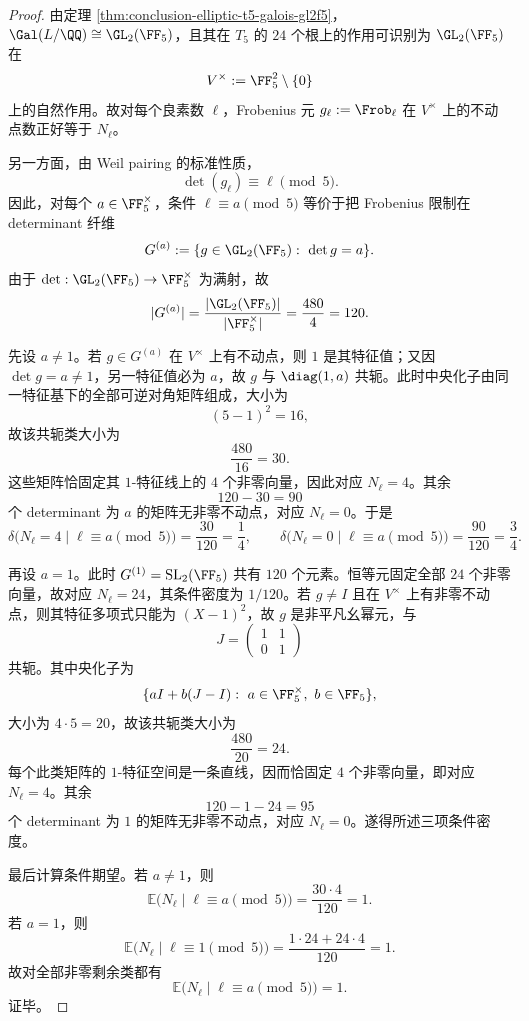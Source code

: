 \begin{proof}
由定理 \ref{thm:conclusion-elliptic-t5-galois-gl2f5}，\(\Gal(L/\QQ)\cong \GL_2(\FF_5)\)，且其在 \(T_5\) 的 \(24\) 个根上的作用可识别为 \(\GL_2(\FF_5)\) 在
\[
V^\times:=\FF_5^2\setminus\{0\}
\]
上的自然作用。故对每个良素数 \(\ell\)，Frobenius 元 \(g_\ell:=\Frob_\ell\) 在 \(V^\times\) 上的不动点数正好等于 \(N_\ell\)。

另一方面，由 Weil pairing 的标准性质，
\[
\det(g_\ell)\equiv \ell \pmod 5.
\]
因此，对每个 \(a\in\FF_5^\times\)，条件 \(\ell\equiv a\pmod 5\) 等价于把 Frobenius 限制在 determinant 纤维
\[
G^{(a)}:=\{g\in \GL_2(\FF_5):\ \det g=a\}.
\]
由于 \(\det:\GL_2(\FF_5)\to \FF_5^\times\) 为满射，故
\[
|G^{(a)}|=\frac{|\GL_2(\FF_5)|}{|\FF_5^\times|}=\frac{480}{4}=120.
\]

先设 \(a\neq 1\)。若 \(g\in G^{(a)}\) 在 \(V^\times\) 上有不动点，则 \(1\) 是其特征值；又因 \(\det g=a\neq 1\)，另一特征值必为 \(a\)，故 \(g\) 与 \(\diag(1,a)\) 共轭。此时中央化子由同一特征基下的全部可逆对角矩阵组成，大小为
\[
(5-1)^2=16,
\]
故该共轭类大小为
\[
\frac{480}{16}=30.
\]
这些矩阵恰固定其 \(1\)-特征线上的 \(4\) 个非零向量，因此对应 \(N_\ell=4\)。其余
\[
120-30=90
\]
个 determinant 为 \(a\) 的矩阵无非零不动点，对应 \(N_\ell=0\)。于是
\[
\delta\!\bigl(N_\ell=4\mid \ell\equiv a\!\!\!\!\pmod 5\bigr)=\frac{30}{120}=\frac14,
\qquad
\delta\!\bigl(N_\ell=0\mid \ell\equiv a\!\!\!\!\pmod 5\bigr)=\frac{90}{120}=\frac34.
\]

再设 \(a=1\)。此时 \(G^{(1)}=\mathrm{SL}_2(\FF_5)\) 共有 \(120\) 个元素。恒等元固定全部 \(24\) 个非零向量，故对应 \(N_\ell=24\)，其条件密度为 \(1/120\)。若 \(g\neq I\) 且在 \(V^\times\) 上有非零不动点，则其特征多项式只能为 \((X-1)^2\)，故 \(g\) 是非平凡幺幂元，与
\[
J=\begin{pmatrix}1&1\\0&1\end{pmatrix}
\]
共轭。其中央化子为
\[
\{aI+b(J-I):\ a\in \FF_5^\times,\ b\in \FF_5\},
\]
大小为 \(4\cdot 5=20\)，故该共轭类大小为
\[
\frac{480}{20}=24.
\]
每个此类矩阵的 \(1\)-特征空间是一条直线，因而恰固定 \(4\) 个非零向量，即对应 \(N_\ell=4\)。其余
\[
120-1-24=95
\]
个 determinant 为 \(1\) 的矩阵无非零不动点，对应 \(N_\ell=0\)。遂得所述三项条件密度。

最后计算条件期望。若 \(a\neq 1\)，则
\[
\mathbb E\!\bigl(N_\ell\mid \ell\equiv a\!\!\!\!\pmod 5\bigr)
=
\frac{30\cdot 4}{120}
=
1.
\]
若 \(a=1\)，则
\[
\mathbb E\!\bigl(N_\ell\mid \ell\equiv 1\!\!\!\!\pmod 5\bigr)
=
\frac{1\cdot 24+24\cdot 4}{120}
=
1.
\]
故对全部非零剩余类都有
\[
\mathbb E\!\bigl(N_\ell\mid \ell\equiv a\!\!\!\!\pmod 5\bigr)=1.
\]
证毕。
\end{proof}

